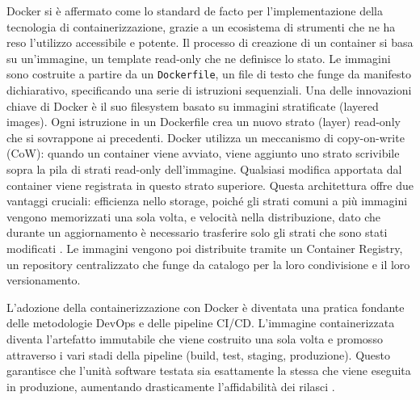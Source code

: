\documentclass[12pt,a4paper,openright,twoside]{book}
\begin{document}
Docker si è affermato come lo standard de facto per l'implementazione della tecnologia di containerizzazione, grazie a un ecosistema di strumenti che ne ha reso l'utilizzo accessibile e potente. Il processo di creazione di un container si basa su un'immagine, un template read-only che ne definisce lo stato. Le immagini sono costruite a partire da un \texttt{Dockerfile}, un file di testo che funge da manifesto dichiarativo, specificando una serie di istruzioni sequenziali. Una delle innovazioni chiave di Docker è il suo filesystem basato su immagini stratificate (layered images). Ogni istruzione in un Dockerfile crea un nuovo strato (layer) read-only che si sovrappone ai precedenti. Docker utilizza un meccanismo di copy-on-write (CoW): quando un container viene avviato, viene aggiunto uno strato scrivibile sopra la pila di strati read-only dell'immagine. Qualsiasi modifica apportata dal container viene registrata in questo strato superiore. Questa architettura offre due vantaggi cruciali: efficienza nello storage, poiché gli strati comuni a più immagini vengono memorizzati una sola volta, e velocità nella distribuzione, dato che durante un aggiornamento è necessario trasferire solo gli strati che sono stati modificati \cite{coha2019evaluating}. Le immagini vengono poi distribuite tramite un Container Registry, un repository centralizzato che funge da catalogo per la loro condivisione e il loro versionamento.

L'adozione della containerizzazione con Docker è diventata una pratica fondante delle metodologie DevOps e delle pipeline CI/CD. L'immagine containerizzata diventa l'artefatto immutabile che viene costruito una sola volta e promosso attraverso i vari stadi della pipeline (build, test, staging, produzione). Questo garantisce che l'unità software testata sia esattamente la stessa che viene eseguita in produzione, aumentando drasticamente l'affidabilità dei rilasci \cite{shafique2024containerization}.
\end{document}
